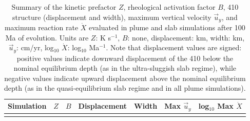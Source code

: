 \documentclass[draft,linenumbers]{agujournal2019}
\newcounter{none}
\begin{document}
\begin{longtable}[]{@{}
  >{\raggedright\arraybackslash}p{}
  >{\raggedleft\arraybackslash}p{}
  >{\raggedleft\arraybackslash}p{}
  >{\raggedleft\arraybackslash}p{}
  >{\raggedleft\arraybackslash}p{}
  >{\raggedleft\arraybackslash}p{}
  >{\raggedleft\arraybackslash}p{}@{}}
\caption{Summary of the kinetic prefactor \(Z\), rheological activation
factor \(B\), 410 structure (displacement and width), maximum vertical
velocity \(\vec{u}_y\), and maximum reaction rate \(\dot{X}\) evaluated
in plume and slab simulations after 100 Ma of evolution. Units are
\(Z\): K s\(^{-1}\), \(B\): none, displacement: km, width: km,
\(\vec{u}_y\): cm/yr, log\(_{10}\) \(\dot{X}\): log\(_{10}\)
Ma\(^{-1}\). Note that displacement values are signed: positive values
indicate downward displacement of the 410 below the nominal equilibrium
depth (as in the ultra-sluggish slab regime), while negative values
indicate upward displacement above the nominal equilibrium depth (as in
the quasi-equilibrium slab regime and in all plume
simulations).}\label{tbl:depth-profile-summary}\tabularnewline
\toprule\noalign{}
\begin{minipage}[b]{\linewidth}\raggedright
Simulation
\end{minipage} & \begin{minipage}[b]{\linewidth}\raggedleft
\(Z\)
\end{minipage} & \begin{minipage}[b]{\linewidth}\raggedleft
\(B\)
\end{minipage} & \begin{minipage}[b]{\linewidth}\raggedleft
Displacement
\end{minipage} & \begin{minipage}[b]{\linewidth}\raggedleft
Width
\end{minipage} & \begin{minipage}[b]{\linewidth}\raggedleft
Max \(\vec{u}_y\)
\end{minipage} & \begin{minipage}[b]{\linewidth}\raggedleft
log\(_{10}\) Max \(\dot{X}\)
\end{minipage} \\
\midrule\noalign{}
\endfirsthead
\toprule\noalign{}

\end{longtable}
\end{document}
